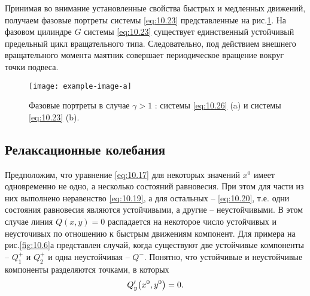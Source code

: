 Принимая во внимание установленные свойства быстрых и медленных движений, получаем фазовые портреты системы
\eqref{eq:10.23} представленные на рис.\ref{fig:10.5}. На фазовом цилиндре $G$ системы \eqref{eq:10.23} существует единственный устойчивый предельный цикл вращательного типа. Следовательно,
под действием внешнего вращательного момента маятник совершает периодическое вращение вокруг точки подвеса.

\begin{figure}[h]
        \centering
        \texttt{[image: example-image-a]}
        \caption{Фазовые портреты в случае $\gamma>1$ : системы \eqref{eq:10.26} (a) и системы \eqref{eq:10.23} (b).}
        \label{fig:10.5}
\end{figure}

\subsection{Релаксационные колебания}%
\label{sub:10.3.3}

Предположим, что уравнение \eqref{eq:10.17} для некоторых значений $x^0$ имеет одновременно
не одно, а несколько состояний равновесия.  При этом для части из них выполнено неравенство \eqref{eq:10.19}, а для остальных -- \eqref{eq:10.20}, т.е. одни состояния равновесия являются
устойчивыми, а другие -- неустойчивыми. В этом случае линия $Q(x,y) = 0$ распадается на некоторое
число устойчивых и неусточивых по отношению к быстрым движениям компонент. Для примера на рис.\ref{fig:10.6}а представлен случай, когда существуют две устойчивые компоненты -- $Q^{+}_{1}$ 
и $Q_{2}^{+}$ и одна неустойчивая -- $Q^{-}$. Понятно, что устойчивые и неустойчивые компоненты 
разделяются точками, в которых
\begin{equation}
        \label{eq:10.27}
        Q'_y\qty(x^{0}, y^{0}) = 0.
\end{equation}

